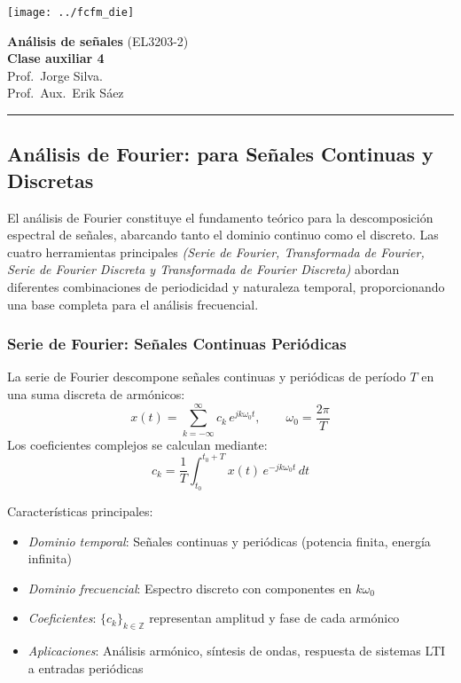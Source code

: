 \documentclass[
  11pt,
  letterpaper,
   addpoints,
   answers
  ]{exam}
\begin{document}
\noindent
\begin{minipage}{0.47\textwidth}
\texttt{[image: ../fcfm\_die]}
\end{minipage}
\begin{minipage}{0.53\textwidth}
\begin{center} 
\large\textbf{Análisis de señales} (EL3203-2) \\
\large\textbf{Clase auxiliar 4} \\
\normalsize Prof.~Jorge Silva.\\
\normalsize Prof.~Aux.~Erik Sáez
\end{center}
\end{minipage}

\vspace{0.5cm}
\noindent
\vspace{.85cm}
\noindent\rule{\textwidth}{0.4pt}
\subsection*{Análisis de Fourier: para Señales Continuas y Discretas}

El análisis de Fourier constituye el fundamento teórico para la descomposición espectral de señales, abarcando tanto el dominio continuo como el discreto. Las cuatro herramientas principales \textit{(Serie de Fourier, Transformada de Fourier, Serie de Fourier Discreta y Transformada de Fourier Discreta)} abordan diferentes combinaciones de periodicidad y naturaleza temporal, proporcionando una base completa para el análisis frecuencial.

\subsubsection*{Serie de Fourier: Señales Continuas Periódicas}
La serie de Fourier descompone señales continuas y periódicas de período \(T\) en una suma discreta de armónicos:
\begin{equation}
x(t) = \sum_{k=-\infty}^{\infty} c_k\,e^{jk\omega_0 t}, \qquad \omega_0 = \frac{2\pi}{T}
\end{equation}
Los coeficientes complejos se calculan mediante:
\begin{equation}
c_k = \frac{1}{T}\int_{t_0}^{t_0+T} x(t)\,e^{-jk\omega_0 t}\,dt
\end{equation}

Características principales:
\begin{itemize}
\item \textit{Dominio temporal}: Señales continuas y periódicas (potencia finita, energía infinita)
\item \textit{Dominio frecuencial}: Espectro discreto con componentes en \(k\omega_0\)
\item \textit{Coeficientes}: \(\{c_k\}_{k \in \mathbb{Z}}\) representan amplitud y fase de cada armónico
\item \textit{Aplicaciones}: Análisis armónico, síntesis de ondas, respuesta de sistemas LTI a entradas periódicas
\end{itemize}
\end{document}

